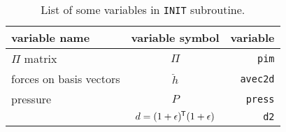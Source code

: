 \begin{table}[h]
 \centering
 \caption{List of some variables in \texttt{INIT} subroutine.}
 \begin{tabular}{@{}lcr@{}}
  \toprule
  variable name           & variable symbol                       & variable        \\
  \midrule
  $\Pi$ matrix            & $\Pi$                                 & \texttt{pim}    \\
  forces on basis vectors & $\ddot{h}$                            & \texttt{avec2d} \\
  pressure                & $P$                                   & \texttt{press}  \\
                          & $d = (1 + \epsilon)^{\mkern-1.5mu\mathsf{T}}(1+\epsilon)$ & \texttt{d2}     \\
  \bottomrule
 \end{tabular}%
 \label{tab:init}%
\end{table}%
